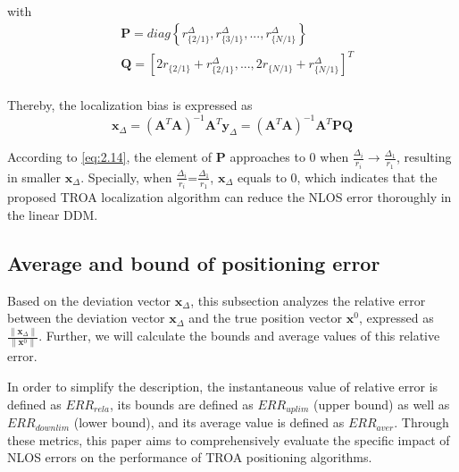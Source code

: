 \documentclass[journal]{IEEEtran}
\begin{document}
with \begin{equation}\label{eq:2.131}
\begin{aligned}
  & \mathbf{P}\!=\!diag\left\{  {{r}_{\{2/1\}}^{\Delta}}, {{r}_{\{3/1\}}^{\Delta}},..., {{r}_{\{N/1\}}^{\Delta}} \right\} \\
 & \mathbf{Q}\!=\!{{\left[2{{r}_{\{2/1\}}}\!+\!{{r}_{\{2/1\}}^{\Delta}},...,2{{r}_{\{N/1\}}}\!+\!{{r}_{\{N/1\}}^{\Delta}} \right]}^{T}} \\
\end{aligned}
\end{equation}

Thereby, the localization bias is expressed as
\begin{equation}\label{eq:2.14}
 \mathbf{x}_{\Delta}={{\left({{\mathbf{A}}^{T}}\mathbf{A}\right)}^{-1}}{{\mathbf{A}}^{T}}\mathbf{y}_{\Delta }={{\left({{\mathbf{A}}^{T}}\mathbf{A}\right)}^{-1}}{{\mathbf{A}}^{T}}\mathbf{PQ}
\end{equation}

According to \eqref{eq:2.14}, the element of ${\mathbf{P}}$ approaches to 0 when ${\frac{\Delta {_{i}}}{{{r}_{i}}}\to \frac{\Delta {_{1}}}{{{r}_{1}}}}$, resulting in smaller ${ \mathbf{x}_{\Delta}}$. Specially, when ${\frac{\Delta {_{i}}}{{{r}_{i}}}\text{=}\frac{\Delta {_{1}}}{{{r}_{1}}}}$, ${ \mathbf{x}_{\Delta}}$ equals to 0, which indicates that the proposed TROA localization algorithm can reduce the NLOS error thoroughly in the linear DDM.
\subsection{Average and bound of positioning error}
Based on the deviation vector ${ \mathbf{x}_{\Delta}}$, this subsection analyzes the relative error between the deviation vector ${ \mathbf{x}_{\Delta}}$ and the true position vector ${ \mathbf{x}^{0}}$, expressed as $ \frac{{\|\mathbf{x}_{\Delta}\|}}{{\|\mathbf{x}^{0}\|}}$.  Further, we will calculate the bounds and average values of this relative error.

In order to simplify the description, the instantaneous value of relative error is defined as ${ERR}_{rela}$, its bounds are defined as ${ERR}_{uplim}$ (upper bound) as well as ${ERR}_{downlim}$ (lower bound), and its average value is defined as ${ERR}_{aver}$. Through these metrics, this paper aims to comprehensively evaluate the specific impact of NLOS errors on the performance of TROA positioning algorithms.
\end{document}
